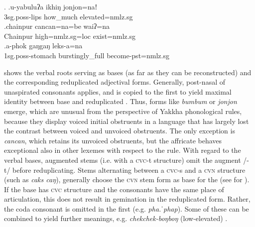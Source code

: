 \ex. \ag.u-yabuluʔa ikhiŋ jonjon=naǃ\\
		{\sc 3sg.poss}-lips how\_much elevated{\sc =nmlz.sg}\\
 	\bg.chainpur cancan=na=be waiʔ=na\\
	Chainpur high{\sc =nmlz.sg=loc} exist{\sc [3sg]=nmlz.sg}		\\
		\bg.a-phok gaŋgaŋ leks-a=na\\
	{\sc 1sg.poss}-stomach burstingly\_full  become{\sc [3sg]-pst=nmlz.sg}		\\

  shows the verbal roots serving as bases (as far as they can be reconstructed) and the corresponding reduplicated adjectival forms. Generally, post-nasal  of unaspirated consonants applies, and is copied to the first  to yield maximal identity between base and reduplicated . Thus, forms like \emph{bumbum} or \emph{jonjon} emerge, which are unusual from the perspective of Yakkha phonological rules, because they display voiced initial obstruents in a language that has largely lost the contrast between voiced and unvoiced obstruents. The only exception is \emph{cancan}, which retains its unvoiced obstruents, but the affricate behaves exceptional also in other lexemes with respect to the  rule. With regard to the verbal bases, augmented stems (i.e. with a \textsc{cvc}-t structure) omit the augment /-t/ before reduplicating. Stems alternating between a \textsc{cvc}-s and a \textsc{cvn} structure (such as \emph{caks \ti caŋ}), generally choose the \textsc{cvn} stem form as base for the  (see   for ). If the base has \textsc{cvc} structure and the consonants have the same place of articulation, this does not result in gemination in the reduplicated form. Rather, the coda consonant is omitted in the first  (e.g. \emph{pha.ˈphap}). Some of these  can be combined to yield further meanings, e.g. \emph{chekchek-boŋboŋ} (low-elevated) . 


